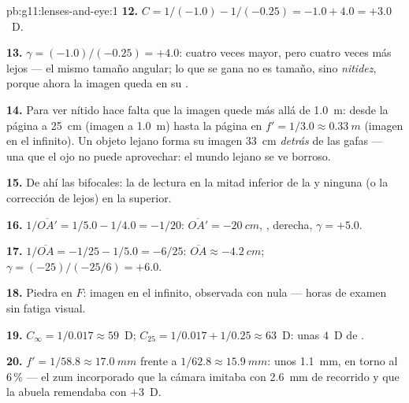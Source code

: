 \begin{solution}{pb:g11:lenses-and-eye:1}
\textbf{12.} $C = 1/(-1.0) - 1/(-0.25) = -1.0 + 4.0 = +3.0$~D.

\textbf{13.} $\gamma = (-1.0)/(-0.25) = +4.0$: cuatro veces mayor, pero
cuatro veces más lejos --- el mismo tamaño angular; lo que se gana no es
tamaño, sino \emph{nitidez}, porque ahora la imagen queda en su .

\textbf{14.} Para ver nítido hace falta que la imagen quede más allá de
\qty{1.0}{m}: desde la página a \qty{25}{cm} (imagen a \qty{1.0}{m})
hasta la página en $f' = 1/3.0 \approx \qty{0.33}{m}$ (imagen en el
infinito). Un objeto lejano forma su imagen \qty{33}{cm} \emph{detrás}
de las gafas --- una  que el ojo no puede aprovechar: el
mundo lejano se ve borroso.

\textbf{15.} De ahí las bifocales: la  de lectura en la mitad
inferior de la  y ninguna (o la corrección de lejos) en la
superior.

\textbf{16.} $1/\overline{OA'} = 1/5.0 - 1/4.0 = -1/20$:
$\overline{OA'} = \qty{-20}{cm}$, , derecha, $\gamma = +5.0$.

\textbf{17.} $1/\overline{OA} = -1/25 - 1/5.0 = -6/25$:
$\overline{OA} \approx \qty{-4.2}{cm}$;
$\gamma = (-25)/(-25/6) = +6.0$.

\textbf{18.} Piedra en $F$: imagen en el infinito, observada con
 nula --- horas de examen sin fatiga visual.

\textbf{19.} $C_\infty = 1/0.017 \approx 59$~D;
$C_{25} = 1/0.017 + 1/0.25 \approx 63$~D: unas $4$~D de .

\textbf{20.} $f' = 1/58.8 \approx \qty{17.0}{mm}$ frente a
$1/62.8 \approx \qty{15.9}{mm}$: unos \qty{1.1}{mm}, en torno al $6\,\%$
--- el zum incorporado que la cámara imitaba con \qty{2.6}{mm} de
recorrido y que la abuela remendaba con $+3$~D.
\end{solution}
